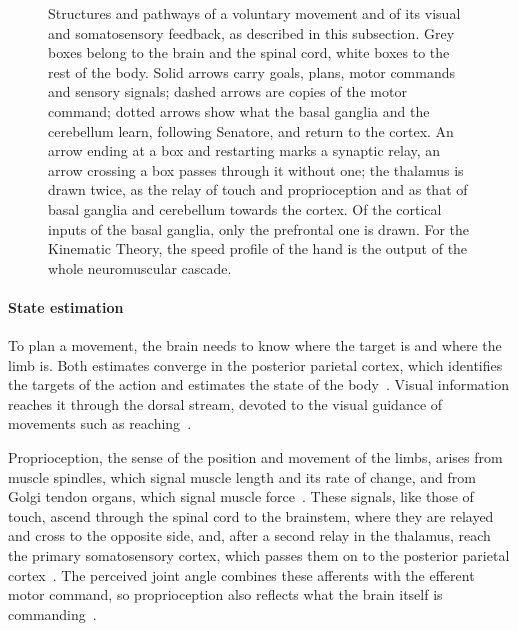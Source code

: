 \documentclass[12pt]{report}
\begin{document}
\begin{figure}[htbp]
    \centering
    \resizebox{\linewidth}{!}{%
    
    }
    \caption[Structures and pathways of a voluntary movement and of its feedback]{Structures and pathways of a voluntary movement and of its visual and somatosensory feedback, as described in this subsection. Grey boxes belong to the brain and the spinal cord, white boxes to the rest of the body. Solid arrows carry goals, plans, motor commands and sensory signals; dashed arrows are copies of the motor command; dotted arrows show what the basal ganglia and the cerebellum learn, following Senatore, and return to the cortex. An arrow ending at a box and restarting marks a synaptic relay, an arrow crossing a box passes through it without one; the thalamus is drawn twice, as the relay of touch and proprioception and as that of basal ganglia and cerebellum towards the cortex. Of the cortical inputs of the basal ganglia, only the prefrontal one is drawn. For the Kinematic Theory, the speed profile of the hand is the output of the whole neuromuscular cascade.}
    \label{fig:motor_control}
\end{figure}

\paragraph{State estimation}
To plan a movement, the brain needs to know where the target is and where the limb is. Both estimates converge in the posterior parietal cortex, which identifies the targets of the action and estimates the state of the body~\cite[p.~857]{scott2021}. Visual information reaches it through the dorsal stream, devoted to the visual guidance of movements such as reaching~\cite[p.~505]{gilbertdas2021}.

Proprioception, the sense of the position and movement of the limbs, arises from muscle spindles, which signal muscle length and its rate of change, and from Golgi tendon organs, which signal muscle force~\cite[p.~421]{gardner2021}. These signals, like those of touch, ascend through the spinal cord to the brainstem, where they are relayed and cross to the opposite side, and, after a second relay in the thalamus, reach the primary somatosensory cortex, which passes them on to the posterior parietal cortex~\cite[pp.~450--452, 458]{gardner2021touch}. The perceived joint angle combines these afferents with the efferent motor command, so proprioception also reflects what the brain itself is commanding~\cite[pp.~421--422]{gardner2021}.
\end{document}
